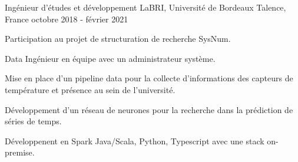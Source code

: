 \begin{cventries}
	\cventry
	{Ingénieur d'études et développement}
	{LaBRI, Université de Bordeaux}
	{Talence, France}
	{octobre 2018 - février 2021}
	{
		\begin{cvitems}
			\item Participation au projet de structuration de recherche SysNum.
			\item Data Ingénieur en équipe avec un administrateur système.
			\item Mise en place d'un pipeline data pour la collecte d'informations des capteurs de température et présence au sein de l'université.
			\item Développement d'un réseau de neurones pour la recherche dans la prédiction de séries de temps.
			\item Développenent en Spark Java/Scala, Python, Typescript avec une stack on-premise.
		\end{cvitems}
	}
	
\end{cventries}